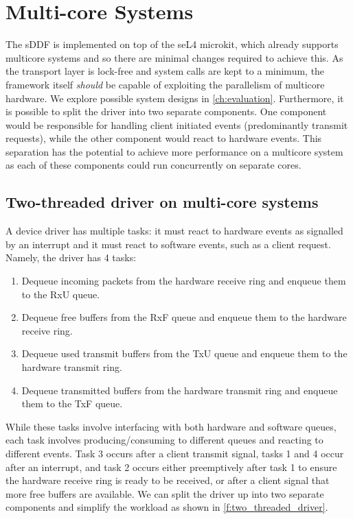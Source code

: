 \section{Multi-core Systems}\label{s:multicore}

The sDDF is implemented on top of the seL4 microkit, which already supports multicore systems
and so there are minimal changes required
to achieve this. As the transport layer is lock-free and system calls are kept to a minimum, the framework itself 
\emph{should} be capable of exploiting the parallelism of multicore hardware. We explore possible system designs in \autoref{ch:evaluation}.
Furthermore, it is possible to split the driver into two separate components. One component would be responsible for
handling client initiated events (predominantly transmit requests), while the other component would react to 
hardware events. This separation has the potential to achieve more performance on a multicore system as
each of these components could run concurrently on separate cores.

\subsection{Two-threaded driver on multi-core systems}
A device driver has multiple tasks: it must react to hardware events as signalled by an interrupt and it must react to software events,
such as a client request. Namely, the driver has 4 tasks:

\begin{enumerate}
    \item Dequeue incoming packets from the hardware receive ring and enqueue them to the RxU queue.
    \item Dequeue free buffers from the RxF queue and enqueue them to the hardware receive ring.
    \item Dequeue used transmit buffers from the TxU queue and enqueue them to the hardware transmit ring.
    \item Dequeue transmitted buffers from the hardware transmit ring and enqueue them to the TxF queue. 
\end{enumerate}

While these tasks involve interfacing with both hardware and software queues, each task involves
producing/consuming to different queues and reacting to different events. Task 3 occurs after a client transmit signal, 
tasks 1 and 4 occur after an interrupt, and task 2 occurs either preemptively after task 1 to ensure the hardware receive
ring is ready to be received, or after a client signal that more free buffers are available. We can split the driver up into
two separate components and simplify the workload as shown in \autoref{f:two_threaded_driver}.

